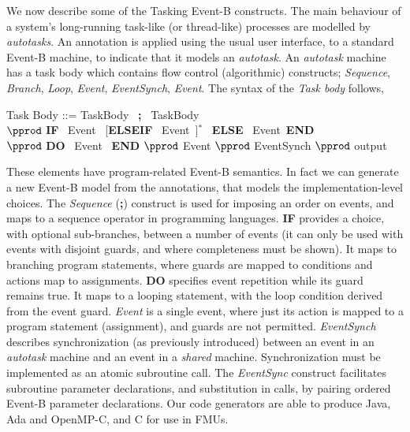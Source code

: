 \documentclass{llncs}%
\begin{document}
We now describe some of the Tasking Event-B constructs. The main behaviour of a system's  long-running task-like (or thread-like) processes are modelled by \emph{autotasks}. An annotation is applied using the usual user interface, to a standard Event-B machine, to indicate that it models an \emph{autotask}. An \emph{autotask} machine has a task body which contains flow control (algorithmic) constructs; \emph{Sequence}, \emph{Branch}, \emph{Loop}, \emph{Event}, \emph{EventSynch}, \emph{Event}. The syntax of the \emph{Task body} follows,
%
%
\begin{center}
\begin{minipage}{0.7\textwidth}
Task Body ::= TaskBody~ \textbf{;}~ TaskBody\\
\hspace*{1cm}$\pprod$ \textbf{IF}~ Event~ [\textbf{ELSEIF}~ Event~]$^*$~ \textbf{ELSE}~ Event~\textbf{END} \\
\hspace*{1cm}$\pprod$ \textbf{DO}~ Event~ \textbf{END} $\pprod$ Event $\pprod$ EventSynch $\pprod$ output 
\end{minipage}
\end{center}
%
\noindent These elements have program-related Event-B semantics. In fact we can generate a new Event-B model from the annotations, that models the implementation-level choices. The \emph{Sequence} (\textbf{;}) construct is used for imposing an order on events, and maps to a sequence operator in programming languages. \textbf{IF} provides a choice, with optional sub-branches, between a number of events (it can only be used with events with disjoint guards, and where completeness must be shown). It maps to branching program statements, where guards are mapped to conditions and actions map to assignments. \textbf{DO} specifies event repetition while its guard remains true. It maps to a looping statement, with the loop condition derived from the event guard. \emph{Event} is a single event, where just its action is mapped to a program statement (assignment), and guards are not permitted. \emph{EventSynch} describes synchronization (as previously introduced) between an event in an \emph{autotask} machine and an event in a \emph{shared} machine. Synchronization must be implemented as an atomic subroutine call. The \emph{EventSync} construct facilitates subroutine parameter declarations, and substitution in calls, by pairing ordered Event-B parameter declarations. Our code generators are able to produce Java, Ada and OpenMP-C, and C for use in FMUs.
\end{document}
